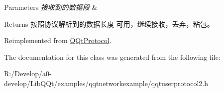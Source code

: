 \begin{DoxyParams}{Parameters}
{\em 接收到的数据段} & \\
\hline
\end{DoxyParams}
\begin{DoxyReturn}{Returns}
按照协议解析到的数据长度 可用，继续接收，丢弃，粘包。 
\end{DoxyReturn}


Reimplemented from \mbox{\hyperlink{class_q_qt_protocol_a00fd0c1ac23379ed3b9b25da9a34f39b}{Q\+Qt\+Protocol}}.



The documentation for this class was generated from the following file\+:\begin{DoxyCompactItemize}
\item 
R\+:/\+Develop/a0-\/develop/\+Lib\+Q\+Qt/examples/qqtnetworkexample/qqtuserprotocol2.\+h\end{DoxyCompactItemize}
